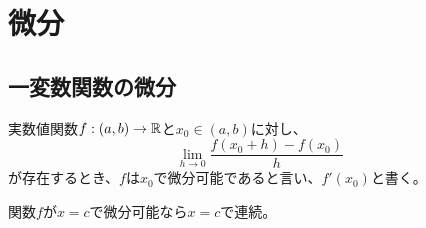 \section{微分}

\subsection{一変数関数の微分}
	\begin{dfn}[常微分]
		実数値関数$f : (a, b) \to \mathbb{R}$と$x_0 \in (a, b)$に対し、
			\[\lim_{h \to 0} \frac{f(x_0 + h) - f(x_0)}{h}\]
		が存在するとき、$f$は$x_0$で微分可能であると言い、$f'(x_0)$と書く。
	\end{dfn}
	\begin{prop}
		関数$f$が$x = c$で微分可能なら$x = c$で連続。
	\end{prop}
	
